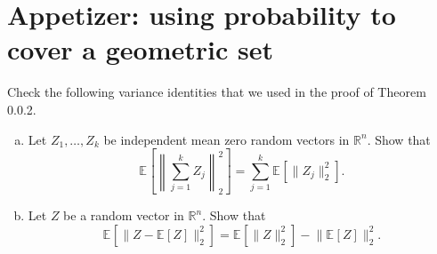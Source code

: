 \chapter*{Appetizer: using probability to cover a geometric set}

\begin{problem*}[Exercise 0.0.3]\label{ex0.0.3}
	Check the following variance identities that we used in the proof of Theorem 0.0.2.
	\begin{enumerate}[(a)]
		\item\label{ex0.0.3:a} Let \(Z_1, \dots , Z_k\) be independent mean zero random vectors in \(\mathbb{R} ^n\). Show that
		      \[
			      \mathbb{E}_{}\left[\left\lVert \sum_{j=1}^{k} Z_j \right\rVert _2^2\right]
			      = \sum_{j=1}^{k} \mathbb{E}_{}[\lVert Z_j \rVert _2^2] .
		      \]
		\item\label{ex0.0.3:b} Let \(Z\) be a random vector in \(\mathbb{R} ^n\). Show that
		      \[
			      \mathbb{E}_{}[\lVert Z - \mathbb{E}_{}[Z] \rVert _2^2]
			      = \mathbb{E}_{}[\lVert Z \rVert _2^2] - \lVert \mathbb{E}_{}[Z] \rVert _2^2.
		      \]
	\end{enumerate}
\end{problem*}
